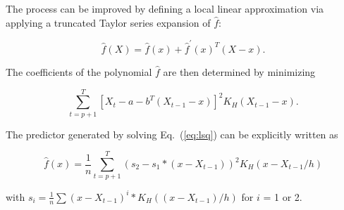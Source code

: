 \documentclass[times,10pt,finalversion]{usetex-v1}
\begin{document}
The process can be improved by defining a local linear approximation
via applying a truncated Taylor series expansion of $\hat{f}$:
{\setlength{\abovedisplayskip}{0pt plus 0pt minus 0pt}
 \setlength{\belowdisplayskip}{0pt plus 0pt minus 0pt}
\begin{small}
  \begin{equation}
    \label{eq:localtaylor}
    \hat{f}(X)=\hat{f}(x)+\hat{f}^{'}(x)^{T}(X-x).\nonumber
  \end{equation}
\end{small}}
The coefficients of the polynomial $\hat{f}$ are then determined by minimizing
{\setlength{\abovedisplayskip}{0pt plus 0pt minus 0pt}
 \setlength{\belowdisplayskip}{0pt plus 0pt minus 0pt}
\begin{small}
  \begin{equation}
    \label{eq:lsq}
    \displaystyle\sum_{t=p+1}^{T}\left[X_{t}-a-b^{T}(X_{t-1}-x)\right]^{2}K_{H}(X_{t-1}-x).
  \end{equation}
\end{small}}
The predictor generated by
solving Eq.~(\ref{eq:lsq}) can be explicitly written as
{\setlength{\abovedisplayskip}{0pt plus 0pt minus 0pt}
 \setlength{\belowdisplayskip}{0pt plus 0pt minus 0pt}
\begin{small}
  \begin{equation}
    \label{eq:locallin}
    \hat{f}(x)=\frac{1}{n}\displaystyle\sum_{t=p+1}^{T}(s_{2}-s_{1}*(x-X_{t-1}))^{2} K_{H}(x-X_{t-1}/h)
  \end{equation}
\end{small}}
with
$s_{i}=\frac{1}{n}\displaystyle\sum(x-X_{t-1})^{i}*K_{H}((x-X_{t-1})/h)$
for $i$ = 1 or 2.
\end{document}
